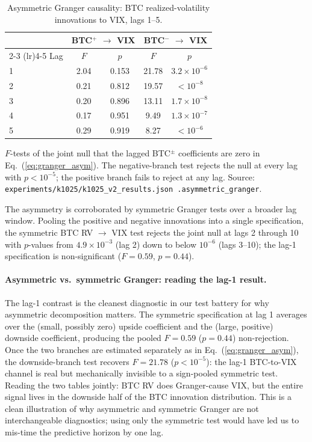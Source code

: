 \documentclass[11pt,a4paper]{article}
\begin{document}
\begin{table}[H]
\centering
\caption{Asymmetric Granger causality: BTC realized-volatility innovations to VIX, lags 1--5.}
\label{tab:granger_asym}
\begin{tabular}{lcccc}
\toprule
 & \multicolumn{2}{c}{BTC$^+$ $\to$ VIX} & \multicolumn{2}{c}{BTC$^-$ $\to$ VIX} \\
\cmidrule(lr){2-3} \cmidrule(lr){4-5}
Lag & $F$ & $p$ & $F$ & $p$ \\
\midrule
1 & 2.04 & 0.153 & 21.78 & $3.2 \times 10^{-6}$ \\
2 & 0.21 & 0.812 & 19.57 & $< 10^{-8}$ \\
3 & 0.20 & 0.896 & 13.11 & $1.7 \times 10^{-8}$ \\
4 & 0.17 & 0.951 & 9.49  & $1.3 \times 10^{-7}$ \\
5 & 0.29 & 0.919 & 8.27  & $< 10^{-6}$ \\
\bottomrule
\end{tabular}
\begin{flushleft}
\footnotesize $F$-tests of the joint null that the lagged BTC$^{\pm}$ coefficients are zero in Eq.~(\ref{eq:granger_asym}). The negative-branch test rejects the null at every lag with $p < 10^{-5}$; the positive branch fails to reject at any lag. Source: \texttt{experiments/k1025/k1025\_v2\_results.json .asymmetric\_granger}.
\end{flushleft}
\end{table}

The asymmetry is corroborated by symmetric Granger tests over a broader lag window. Pooling the positive and negative innovations into a single specification, the symmetric BTC RV $\to$ VIX test rejects the joint null at lags 2 through 10 with $p$-values from $4.9 \times 10^{-3}$ (lag 2) down to below $10^{-6}$ (lags 3--10); the lag-1 specification is non-significant ($F = 0.59$, $p = 0.44$).%


\paragraph{Asymmetric vs.\ symmetric Granger: reading the lag-1 result.} The lag-1 contrast is the cleanest diagnostic in our test battery for why asymmetric decomposition matters. The symmetric specification at lag 1 averages over the (small, possibly zero) upside coefficient and the (large, positive) downside coefficient, producing the pooled $F = 0.59$ ($p = 0.44$) non-rejection. Once the two branches are estimated separately as in Eq.~(\ref{eq:granger_asym}), the downside-branch test recovers $F = 21.78$ ($p < 10^{-5}$): the lag-1 BTC-to-VIX channel is real but mechanically invisible to a sign-pooled symmetric test. Reading the two tables jointly: BTC RV does Granger-cause VIX, but the entire signal lives in the downside half of the BTC innovation distribution. This is a clean illustration of why asymmetric and symmetric Granger are not interchangeable diagnostics; using only the symmetric test would have led us to mis-time the predictive horizon by one lag.
\end{document}
